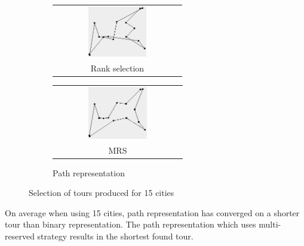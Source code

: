\documentclass[10pt,a4paper,openbib]{article}
\makeatletter
\newcommand{\subsubfloat}[2]{%
  \begin{tabular}{@{}c@{}}#1\\#2\end{tabular}%
}
\makeatother
\begin{document}
\begin{multicols}{2}
\begin{figure}[H]
\begin{center}
\begin{subfigure}[b]{0.24\textwidth}
\begin{minipage}{\textwidth}
  		\subsubfloat{\includegraphics[width=0.48\textwidth]{images/result2/Pathfalse2.png}}{Rank selection}\label{fig:cities15toursOR}
  		\subsubfloat{\includegraphics[width=0.48\textwidth]{images/result2/Pathtrue6.png}}{MRS}\label{fig:cities15toursOM}
 		\caption{Path representation}\label{fig:cities15toursO}
  \end{minipage}
        
    \end{subfigure} 
    \caption{Selection of tours produced for 15 cities}
    \label{fig:cities15tours}
\end{center}
\end{figure}


\noindent On average when using 15 cities, path representation has converged on a shorter tour than binary representation. The path representation which uses multi-reserved strategy results in the shortest found tour. \\



\end{multicols}
\end{document}
